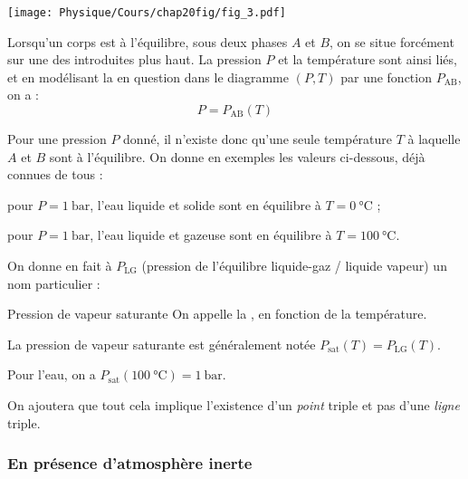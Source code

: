 \documentclass[a4paper,french,bookmarks]{article}
\begin{document}
\begin{minipage}{0.58\linewidth}
    \centering
    \texttt{[image: Physique/Cours/chap20fig/fig\_3.pdf]}
\end{minipage}
%
\hfill
%
\begin{minipage}{0.4\linewidth}
    Lorsqu'un corps est à l'équilibre, sous deux phases $A$ et $B$, on se situe forcément sur une des  introduites plus haut. La pression $P$ et la température sont ainsi liés, et en modélisant la  en question dans le diagramme $(P, T)$ par une fonction $P_\text{AB}$, on a :
    \[ P = P_\text{AB}\left(T\right)\]
    
    Pour une pression $P$ donné, il n'existe donc qu'une seule température $T$ à laquelle $A$ et $B$ sont à l'équilibre. On donne en exemples les valeurs ci-dessous, déjà connues de tous  :
    \begin{enumerate}
        \itt pour $P = \SI{1}{\bar}$, l'eau liquide et solide sont en équilibre à $T = \SI{0}{\celsius}$ ;
        
        \itt pour $P = \SI{1}{\bar}$, l'eau liquide et gazeuse sont en équilibre à $T = \SI{100}{\celsius}$.
    \end{enumerate}
    On donne en fait à $P_\text{LG}$ (pression de l'équilibre liquide-gaz / liquide vapeur) un nom particulier :
\end{minipage}

\begin{definition}{Pression de vapeur saturante}{}
    On appelle  la , en fonction de la température.
\end{definition}

La pression de vapeur saturante est généralement notée $P_\text{sat}\left(T\right) = P_\text{LG}\left(T\right)$.

\begin{enumerate}
    \itt Pour l'eau, on a $P_\text{sat}\left(\SI{100}{\celsius}\right) = \SI{1}{\bar}$.
\end{enumerate}

On ajoutera que tout cela implique l'existence d'un \textit{point} triple et pas d'une \textit{ligne} triple.

\subsubsection{En présence d'atmosphère inerte}
\end{document}
